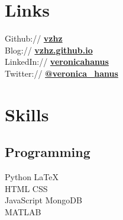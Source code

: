 \documentclass[letterpaper]{deedy-resume} %
\begin{document}
\begin{minipage}[t]{0.33\textwidth} %


\section{Links} 

Github:// \href{https://github.com/vzhz}{\bf vzhz} \\
Blog:// \href{https://vzhz.github.io}{\bf vzhz.github.io} \\
LinkedIn:// \href{https://www.linkedin.com/in/veronicahanus}{\bf veronicahanus} \\
Twitter:// \href{https://twitter.com/veronica_hanus}{\bf @veronica\_hanus}
\sectionspace %


\section{Skills}

\subsection{Programming}

Python \textbullet{} \LaTeX \\%
HTML \textbullet{} CSS \\
JavaScript \textbullet{} MongoDB \\%
MATLAB \\%

\sectionspace %



\end{minipage}
\end{document}
